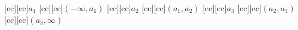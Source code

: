 [cc][cc]{$a_1$}
[cc][cc]{$(-\infty, a_1)$}
[cc][cc]{$a_2$}
[cc][cc]{$(a_1, a_2)$}
[cc][cc]{$a_3$}
[cc][cc]{$(a_2, a_3)$}
[cc][cc]{$(a_3, \infty)$}
